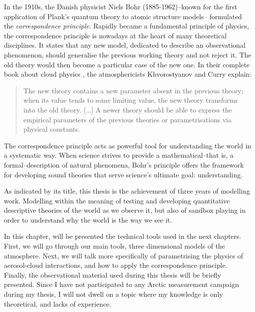 In the 1910s, the Danish physicist Niels Bohr (1885-1962)\---known for the first application of Plank's quantum theory to atomic structure models\--- formulated the \textit{correspondence principle}.
Rapidly became a fundamental principle of physics, the correspondence principle is nowadays at the heart of many theoretical disciplines.
It states that any new model, dedicated to describe an observational phenomenon, should generalise the previous working theory and not reject it. The old theory would then become a particular case of the new one.
In their complete book about cloud physics \citep{curry_thermodynamics_2014}, the atmosphericists Khvorostyanov and Curry explain: %
\begin{quote}
    The new theory contains a new parameter absent in the previous theory; when its value tends to some limiting value, the new theory transforms into the old theory. [...] A newer theory should be able to express the empirical parameters of the previous theories or parametrisations via physical constants. 
\end{quote} %

The correspondence principle acts as powerful tool for understanding the world in a systematic way. When science strives to provide a mathematical\---that is, a formal\---description of natural phenomena, Bohr’s principle offers the framework for developing sound theories that serve science’s ultimate goal: understanding.
\vspace{\baselineskip}

As indicated by its title, this thesis is the achievement of three years of modelling work. Modelling within the meaning of testing and developing quantitative descriptive theories of the world as we observe it, but also of sandbox playing in order to understand why the world is the way we see it.

In this chapter, will be presented the technical tools used in the next chapters.
First, we will go through our main tools, three dimensional models of the atmosphere.
Next, we will talk more specifically of parametrising the physics of aerosol-cloud interactions, and how to apply the correspondence principle.
Finally, the observational material used during this thesis will be briefly presented. Since I have not participated to any Arctic measurement campaign during my thesis, I will not dwell on a topic where my knowledge is only theoretical, and lacks of experience.

